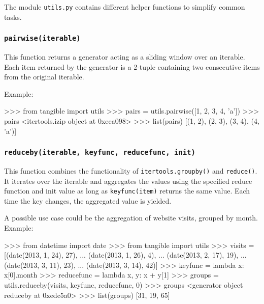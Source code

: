 The module \texttt{utils.py} contains different helper functions to simplify
common tasks.


\subsubsection{\texttt{pairwise(iterable)}}

\noindent This function returns a generator acting as a sliding window over an iterable.
Each item returned by the generator is a 2-tuple containing two consecutive
items from the original iterable.

\vspace{.5\baselineskip}

\noindent Example:

\vspace{.5\baselineskip}
\begin{pythoncode}
>>> from tangible import utils
>>> pairs = utils.pairwise([1, 2, 3, 4, 'a'])
>>> pairs
<itertools.izip object at 0xeea098>
>>> list(pairs)
[(1, 2), (2, 3), (3, 4), (4, 'a')]
\end{pythoncode}


\subsubsection{\texttt{reduceby(iterable, keyfunc, reducefunc, init)}}

This function combines the functionality of \texttt{itertools.groupby()} and
\texttt{reduce()}. It iterates over the iterable and aggregates the values using
the specified reduce function and init value as long as \texttt{keyfunc(item)}
returns the same value. Each time the key changes, the aggregated value is
yielded.

A possible use case could be the aggregation of website visits, grouped by
month. Example:

\vspace{.5\baselineskip}
\begin{pythoncode}
>>> from datetime import date
>>> from tangible import utils
>>> visits = [(date(2013, 1, 24), 27),
...           (date(2013, 1, 26), 4),
...           (date(2013, 2, 17), 19),
...           (date(2013, 3, 11), 23),
...           (date(2013, 3, 14), 42)]
>>> keyfunc = lambda x: x[0].month
>>> reducefunc = lambda x, y: x + y[1]
>>> groups = utils.reduceby(visits, keyfunc, reducefunc, 0)
>>> groups
<generator object reduceby at 0xedc5a0>
>>> list(groups)
[31, 19, 65]
\end{pythoncode}

